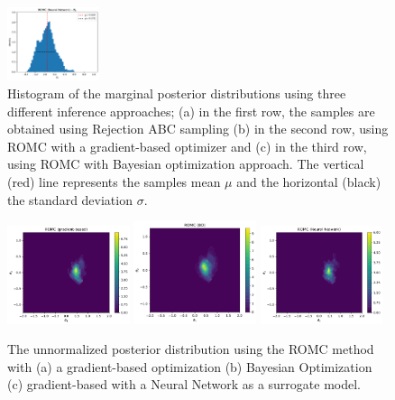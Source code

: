 \documentclass[nojss]{jss}
\begin{document}
\begin{figure}[ht]
\begin{center}
    \includegraphics[width=0.24\textwidth]{./images/chapter4/mae2_hist_t2_romc_nn.pdf}
    \end{center}
    \caption[MA2 example, evaluation of the marginal
    distributions.]{Histogram of the marginal posterior distributions
      using three different inference approaches; (a) in the first
      row, the samples are obtained using Rejection ABC sampling (b)
      in the second row, using ROMC with a gradient-based optimizer
      and (c) in the third row, using ROMC with Bayesian optimization
      approach. The vertical (red) line represents the samples mean
      \(\mu\) and the horizontal (black) the standard deviation
      \(\sigma\).}
  \label{fig:ma2_3}
\end{figure}

\begin{figure}[ht]
  \begin{center}
    \includegraphics[width=0.32\textwidth]{./images/chapter4/mae2_romc_posterior.pdf}
    \includegraphics[width=0.32\textwidth]{./images/chapter4/mae2_romc_posterior_bo.pdf}
    \includegraphics[width=0.32\textwidth]{./images/chapter4/mae2_romc_posterior_nn.pdf}
    \end{center}
    \caption[MA2 example, posterior distribution.]{The unnormalized posterior distribution using the ROMC method with (a) a gradient-based optimization (b) Bayesian Optimization (c) gradient-based with a Neural Network as a surrogate model.}
  \label{fig:ma2_4}
\end{figure}
\end{document}
